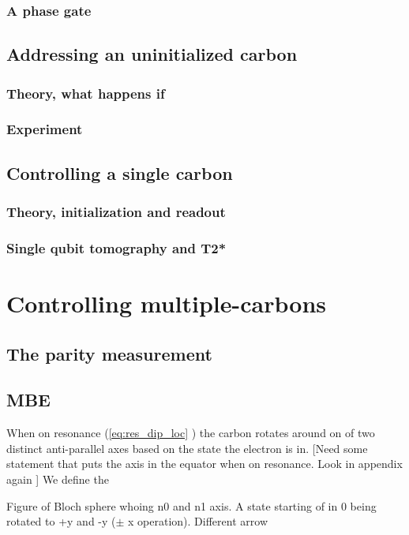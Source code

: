 \subsubsection{A phase gate}

\subsection{Addressing an uninitialized carbon}
\subsubsection{Theory, what happens if }
\subsubsection{Experiment}

\subsection{Controlling a single carbon}
\subsubsection{Theory, initialization and readout}
\subsubsection{Single qubit tomography and T2*}

\section{Controlling multiple-carbons}
\subsection{The parity measurement}
\subsection{MBE}


When on resonance (\cref{eq:res_dip_loc} ) the carbon rotates around on of two distinct anti-parallel axes based on the state the electron is in.
[Need some statement that puts the axis in the equator when on resonance. Look in appendix again ]
We define the

Figure of Bloch sphere whoing n0 and n1 axis.
A state starting of in 0 being rotated to +y and -y ($\pm $ x operation).
Different arrow


